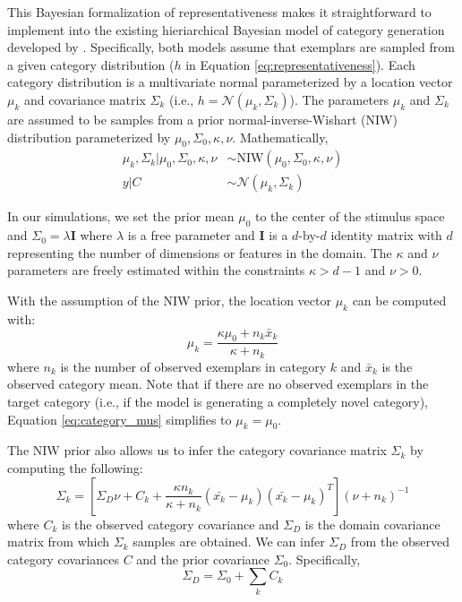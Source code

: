 \documentclass[12pt]{article}
\begin{document}
\begin{flushleft}
This Bayesian formalization of representativeness makes it straightforward to
implement into the existing hieriarchical Bayesian model of category generation
developed by \cite{jern2013probabilistic}. Specifically, both models assume that
exemplars are sampled from a given category distribution ($h$ in
Equation \ref{eq:representativeness}). Each category distribution is a
multivariate normal parameterized by a location vector $\mu_k$ and covariance
matrix $\Sigma_k$ (i.e., $h = \mathcal{N}(\mu_k,\Sigma_k)$). The parameters
$\mu_k$ and $\Sigma_k$ are assumed to be samples from a prior
normal-inverse-Wishart (NIW) distribution parameterized by
$\mu_0,\Sigma_0,\kappa,\nu$. Mathematically,
\begin{align}
  \mu_k, \Sigma_k|\mu_0,\Sigma_0,\kappa,\nu &\sim
                                              \textrm{NIW}(\mu_0,\Sigma_0,\kappa,\nu)
                                              \label{eq:mvnsample}\\
  y|C &\sim \mathcal{N}(\mu_k,\Sigma_k) \label{eq:exemplarsample}
\end{align}

In our simulations, we set the prior mean $\mu_0$ to the center of the stimulus
space and $\Sigma_0 = \lambda \mathbf{I}$ where $\lambda$ is a free parameter
and $\mathbf{I}$ is a $d$-by-$d$ identity matrix with $d$ representing the
number of dimensions or features in the domain. The $\kappa$ and $\nu$
parameters are freely estimated within the constraints $\kappa > d-1$ and
$\nu > 0$.

With the assumption of the NIW prior, the location vector $\mu_k$ can be computed
with:
\begin{equation}
  \mu_k = \dfrac
    {\kappa\mu_{0} + n_k \bar{x}_k}
    {\kappa + n_k}
    \label{eq:category_mus}
\end{equation}
where $n_k$ is the number of observed exemplars in category $k$ and $\bar{x}_k$
is the observed category mean. Note that if there are no observed exemplars in
the target category (i.e., if the model is generating a completely novel
category), Equation \ref{eq:category_mus} simplifies to $\mu_k = \mu_0$.

The NIW prior also allows us to infer the category covariance matrix $\Sigma_k$
by computing the following:
\begin{equation}
  \Sigma_k = [\Sigma_D\nu + C_k +
    \dfrac
    {\kappa n_k}
    {\kappa + n_k}
    (\bar{x_k}-\mu_k)(\bar{x_k}-\mu_k)^T
  ] (\nu + n_k)^{-1}
  \label{eq:Sigma_y}
\end{equation}
where $C_k$ is the observed category covariance and $\Sigma_D$ is the domain
covariance matrix from which $\Sigma_k$ samples are obtained. We can
infer $\Sigma_D$ from the observed category covariances $C$ and the prior
covariance $\Sigma_0$. Specifically,
\begin{equation}
    \Sigma_D = \Sigma_0 + \sum_{k}{C_k}
\end{equation}


\end{flushleft}
\end{document}

